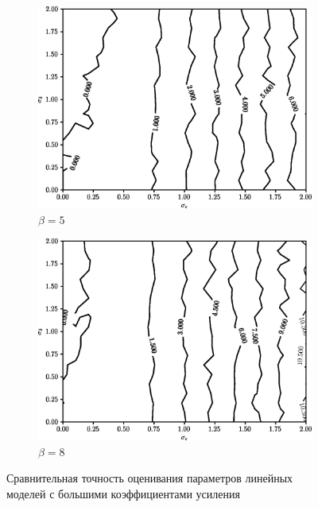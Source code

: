 \begin{figure}[p]
  \begin{subfigure}[b]{\linewidth}
    \centering
    \includegraphics[width=135mm]{fig/linear/param/beta-5_param}
    \caption{\( \beta = 5 \)}
  \end{subfigure}

  \vspace{2\baselineskip}
  \begin{subfigure}[b]{\linewidth}
    \centering
    \includegraphics[width=135mm]{fig/linear/param/beta-8_param}
    \caption{\( \beta = 8 \)}
  \end{subfigure}

  \vspace{\baselineskip}
  \caption{%
    Сравнительная точность оценивания параметров линейных \\
    моделей с большими коэффициентами усиления
  }\label{fig:comparison_linear_params_beta-big}
\end{figure}

